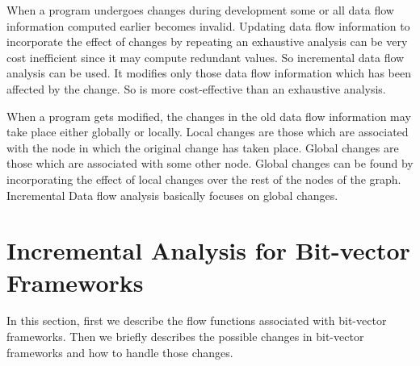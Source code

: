 \documentclass[11pt,a4paper,openright]{report}
\begin{document}
When a program undergoes changes during development some or all data flow information computed earlier becomes invalid. 
Updating data flow information to incorporate the effect of changes by repeating an exhaustive analysis can be very cost inefficient since
it may compute redundant values. So incremental data flow analysis can be used. It modifies only those data flow information which has been
affected by the change. So is more cost-effective than an exhaustive analysis.

When a program gets modified, the changes in the old data flow information may take place either globally or locally. Local changes
are those which are associated with the node in which the original change has taken place. Global changes are those which are associated with some
other node. Global changes can be found by incorporating the effect of local changes over the rest of the nodes of the graph. Incremental Data flow
analysis basically focuses on global changes.


\section{Incremental Analysis for Bit-vector Frameworks}
In this section, first we describe the flow functions associated with bit-vector frameworks. Then we briefly describes the possible changes in bit-vector 
frameworks and how to handle those changes. 
\end{document}

